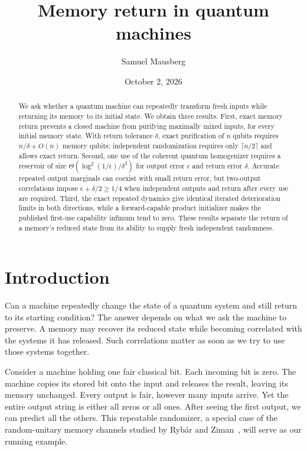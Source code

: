 \documentclass[aps,pra,reprint,superscriptaddress,longbibliography,nofootinbib,floatfix]{revtex4-2}
\begin{document}
\title{Memory return in quantum machines}
\author{Samuel Mausberg}
\date{October 2, 2026}
\begin{abstract}
We ask whether a quantum machine can repeatedly transform fresh inputs while returning its memory to its initial state. We obtain three results. First, exact memory return prevents a closed machine from purifying maximally mixed inputs, for every initial memory state. With return tolerance $\delta$, exact purification of $n$ qubits requires $n/\delta+O(n)$ memory qubits; independent randomization requires only $\lceil n/2\rceil$ and allows exact return. Second, one use of the coherent quantum homogenizer requires a reservoir of size $\Theta(\log^2(1/\epsilon)/\delta^2)$ for output error $\epsilon$ and return error $\delta$. Accurate repeated output marginals can coexist with small return error, but two-output correlations impose $\epsilon+\delta/2\ge1/4$ when independent outputs and return after every use are required. Third, the exact repeated dynamics give identical iterated deterioration limits in both directions, while a forward-capable product initializer makes the published first-use capability infimum tend to zero. These results separate the return of a memory's reduced state from its ability to supply fresh independent randomness.
\end{abstract}
\maketitle

\section{Introduction}

Can a machine repeatedly change the state of a quantum system and still return to its starting condition? The answer depends on what we ask the machine to preserve. A memory may recover its reduced state while becoming correlated with the systems it has released. Such correlations matter as soon as we try to use those systems together.

Consider a machine holding one fair classical bit. Each incoming bit is zero. The machine copies its stored bit onto the input and releases the result, leaving its memory unchanged. Every output is fair, however many inputs arrive. Yet the entire output string is either all zeros or all ones. After seeing the first output, we can predict all the others. This repeatable randomizer, a special case of the random-unitary memory channels studied by Ryb\'{a}r and Ziman~\cite{rybar}, will serve as our running example.
\end{document}
